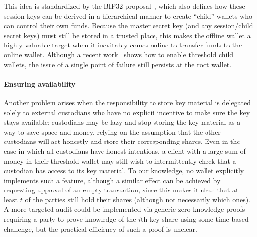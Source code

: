 This idea is standardized by the BIP32 proposal~\cite{bip32}, which also defines how these session keys can be derived in a hierarchical manner to create ``child'' wallets who can control their own funds. 
Because the master secret key (and any session/child secret keys) must still be stored in a trusted place, this makes the offline wallet a highly valuable target when it inevitably comes online to transfer funds to the online wallet.
Although a recent work~\cite{EPRINT:DEFLR23} shows how to enable threshold child wallets, the issue of a single point of failure still persists at the root wallet.

\paragraph{Ensuring availability}
Another problem arises when the responsibility to store key material is delegated solely to external custodians who have no explicit incentive to make sure the key stays available: custodians may be lazy and stop storing the key material as a way to save space and money, relying on the assumption that the other custodians will act honestly and store their corresponding shares. Even in the case in which all custodians have honest intentions, a client with a large sum of money in their threshold wallet may still wish to intermittently check that a custodian has access to its key material. To our knowledge, no wallet explicitly implements such a feature, although a similar effect can be achieved by requesting approval of an empty transaction, since this makes it clear that at least $t$ of the parties still hold their shares (although not necessarily which ones). A more targeted audit could be implemented via generic zero-knowledge proofs requiring a party to prove knowledge of the $i$th key share using some time-based challenge, but the practical efficiency of such a proof is unclear. 
